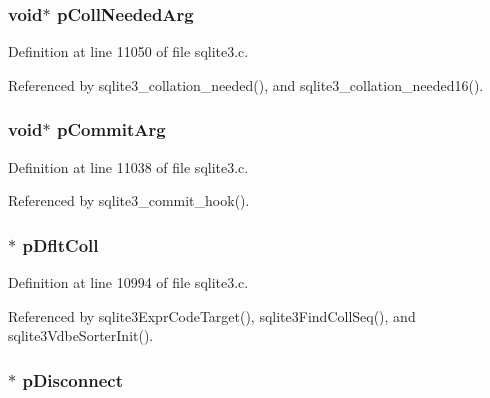 \hypertarget{structsqlite3_a285f6e38f2f35d46cc82827408da1209}{}
\subsubsection[{p\+Coll\+Needed\+Arg}]{\setlength{\rightskip}{0pt plus 5cm}void$\ast$ p\+Coll\+Needed\+Arg}\label{structsqlite3_a285f6e38f2f35d46cc82827408da1209}


Definition at line 11050 of file sqlite3.\+c.



Referenced by sqlite3\+\_\+collation\+\_\+needed(), and sqlite3\+\_\+collation\+\_\+needed16().

\hypertarget{structsqlite3_a41bf104f121d0f25db693beca96d9754}{}
\subsubsection[{p\+Commit\+Arg}]{\setlength{\rightskip}{0pt plus 5cm}void$\ast$ p\+Commit\+Arg}\label{structsqlite3_a41bf104f121d0f25db693beca96d9754}


Definition at line 11038 of file sqlite3.\+c.



Referenced by sqlite3\+\_\+commit\+\_\+hook().

\hypertarget{structsqlite3_a0a423643c89d3583048d6eee485f663e}{}
\subsubsection[{p\+Dflt\+Coll}]{$\ast$ p\+Dflt\+Coll}\label{structsqlite3_a0a423643c89d3583048d6eee485f663e}


Definition at line 10994 of file sqlite3.\+c.



Referenced by sqlite3\+Expr\+Code\+Target(), sqlite3\+Find\+Coll\+Seq(), and sqlite3\+Vdbe\+Sorter\+Init().

\hypertarget{structsqlite3_ab6bccb7e921f505e4742fd39ebc3b2db}{}
\subsubsection[{p\+Disconnect}]{$\ast$ p\+Disconnect}\label{structsqlite3_ab6bccb7e921f505e4742fd39ebc3b2db}


